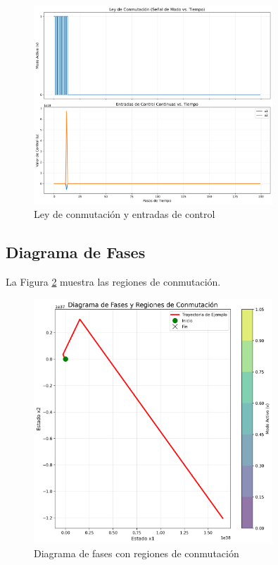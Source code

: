 \begin{figure}[h]
\centering
\includegraphics[width=0.8\textwidth]{plot_switching_signal.png}
\caption{Ley de conmutación y entradas de control}
\label{fig:switching}
\end{figure}

\subsection{Diagrama de Fases}
La Figura \ref{fig:phase} muestra las regiones de conmutación.

\begin{figure}[h]
\centering
\includegraphics[width=0.8\textwidth]{plot_phase_portrait.png}
\caption{Diagrama de fases con regiones de conmutación}
\label{fig:phase}
\end{figure}

